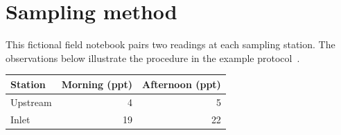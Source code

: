 \section{Sampling method}
This fictional field notebook pairs two readings at each sampling station.
The observations below illustrate the procedure in the example protocol~\cite{fieldguide}.

\begin{tabular}{lrr}
\toprule
Station & Morning (ppt) & Afternoon (ppt)\\
\midrule
Upstream & 4 & 5\\
Inlet & 19 & 22\\
\bottomrule
\end{tabular}
